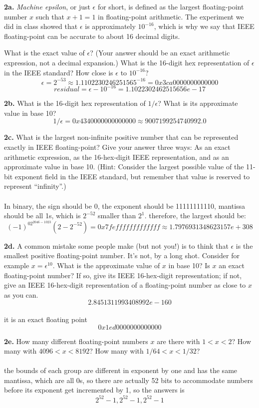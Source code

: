 \documentclass[11pt]{article}
\begin{document}
\par\medskip
{\bf 2a.}
{\em Machine epsilon}, or just $\epsilon$ for short, is defined as the largest
floating-point number $x$ such that $x + 1 = 1$ in floating-point arithmetic.
The experiment we did in class showed that $\epsilon$ is approximately $10^{-16}$,
which is why we say that IEEE floating-point can be accurate to
about 16 decimal digits.

What is the exact value of $\epsilon$? (Your answer should be an exact arithmetic
expression, not a decimal expansion.) What is the 16-digit hex representation of
$\epsilon$ in the IEEE standard? How close is $\epsilon$ to $10^{-16}$?
$$\epsilon = 2^{-53}\approx1.1102230246251565^{-16}=0x3ca0000000000000$$
$$residual = \epsilon-10^{-16}=1.1022302462515656e-17$$
\par\medskip
{\bf 2b.}
What is the 16-digit hex representation of $1/\epsilon$? What is its approximate
value in base 10?\\
$$1/\epsilon  = 0x4340000000000000 \approx 9007199254740992.0$$
\par\medskip
{\bf 2c.}
What is the largest non-infinite positive number that can be represented exactly
in IEEE floating-point? Give your answer three ways: As an exact arithmetic
expression, as the 16-hex-digit IEEE representation, and as an approximate
value in base 10. (Hint: Consider the largest possible value of the 11-bit
exponent field in the IEEE standard, but remember that value is reserved
to represent ``infinity''.)\\\\
In binary, the sign should be 0, the exponent should be 11111111110, mantissa should be all 1s, which is $2^{-52}$ smaller than $2^1$. therefore, the largest should be:$$
(-1)^02^{2046-1023}(2-2^{-52})=0x7fefffffffffffff\approx 1.7976931348623157e+308
$$
\par\medskip
{\bf 2d.}
A common mistake some people make (but not you!) is to think that $\epsilon$ is
the smallest positive floating-point number. It's not, by a long shot. Consider
for example $x = \epsilon^{10}$. What is the approximate value of $x$ in base 10?
Is $x$ an exact floating-point number? If so, give its IEEE 16-hex-digit representation;
if not, give an IEEE 16-hex-digit representation of a floating-point number as
close to $x$ as you can.\\
$$2.8451311993408992e-160$$\\it is an exact floating point
$$0x1ed0000000000000$$

\par\medskip 
{\bf 2e.}
How many different floating-point numbers $x$ are there with $1 < x < 2$?
How many with $4096 < x < 8192$?  How many with $1/64 < x < 1/32$?\\\\
the bounds of each group are different in exponent by one and has the same mantissa, which are all 0s, so there are actually 52 bits to accommodate numbers before its exponent get incremented by 1, so the answers is
$$2^{52}-1, 2^{52}-1,2^{52}-1$$
\end{document}
